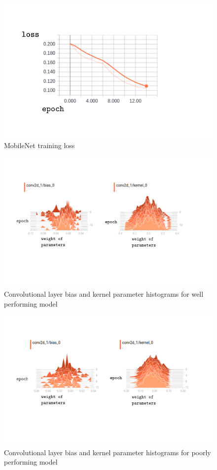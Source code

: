 \documentclass{article}
\begin{document}
\begin{figure}[h]
  \includegraphics[width=\linewidth]{mobileloss.pdf}
  \caption{MobileNet training loss}
  \label{fig:mobileloss}
\end{figure}


\begin{figure}[h]
  \includegraphics[width=\linewidth]{goodearlyweights.pdf}
  \caption{Convolutional layer bias and kernel parameter histograms for well performing model}
  \label{fig:goodearlyweights}
\end{figure}

\begin{figure}[h]
  \includegraphics[width=\linewidth]{badearlyweights.pdf}
  \caption{Convolutional layer bias and kernel parameter histograms for poorly performing model}
  \label{fig:badearlyweights}
\end{figure}
\end{document}
